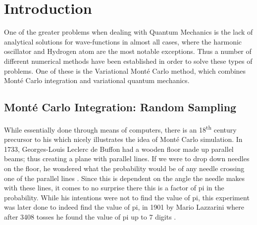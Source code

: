 

\section{Introduction}
One of the greater problems when dealing with Quantum Mechanics is the lack of analytical solutions for wave-functions
in almost all cases, where the harmonic oscillator and Hydrogen atom are the most notable exceptions.
Thus a number of different numerical methods have been established in order to solve these types
of problems. One of these is the Variational Mont\'e Carlo method, which combines Mont\'e Carlo integration and variational
quantum mechanics.


\subsection{Mont\'e Carlo Integration: Random Sampling}
\label{ch:monte}
While essentially done through means of computers, there is an 18\textsuperscript{th} century precursor to
his which nicely illustrates the idea of Mont\'e Carlo simulation. In 1733, Georges-Louis Leclerc
de Buffon had a wooden floor made up parallel beams; thus creating a plane with parallel lines.
If we were to drop down needles on the floor, he wondered what the probability would be of
any needle crossing one of the parallel lines \cite{Buffon}. Since this is dependent on the
angle the needle makes with these lines, it comes to no surprise there this is a factor of pi
in the probability. While his intentions were not to find the value of pi, this experiment
was later done to indeed find the value of pi, in 1901 by Mario Lazzarini where after 3408
tosses he found the value of pi up to 7 digits \cite{Lazzarini}.


